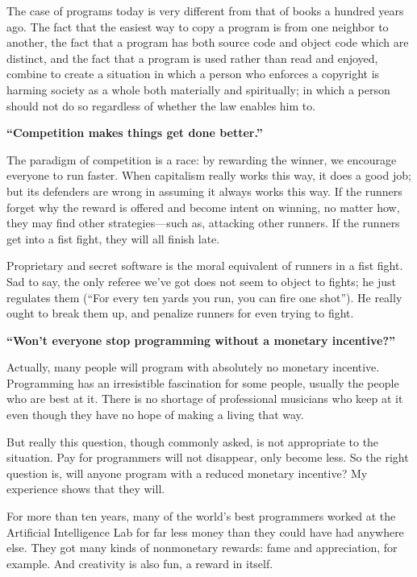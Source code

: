 The case of programs today is very different from that of books a hundred years ago. The fact that the easiest way to copy a program is from one neighbor to another, the fact that a program has both source code and object code which are distinct, and the fact that a program is used rather than read and enjoyed, combine to create a situation in which a person who enforces a copyright is harming society as a whole both materially and spiritually; in which a person should not do so regardless of whether the law enables him to.\par
\textbf{“Competition makes things get done better.”}\par
The paradigm of competition is a race: by rewarding the winner, we encourage everyone to run faster. When capitalism really works this way, it does a good job; but its defenders are wrong in assuming it always works this way. If the runners forget why the reward is offered and become intent on winning, no matter how, they may find other strategies—such as, attacking other runners. If the runners get into a fist fight, they will all finish late.\par
Proprietary and secret software is the moral equivalent of runners in a fist fight. Sad to say, the only referee we've got does not seem to object to fights; he just regulates them (“For every ten yards you run, you can fire one shot”). He really ought to break them up, and penalize runners for even trying to fight.\par
\textbf{“Won't everyone stop programming without a monetary incentive?”}\par
Actually, many people will program with absolutely no monetary incentive. Programming has an irresistible fascination for some people, usually the people who are best at it. There is no shortage of professional musicians who keep at it even though they have no hope of making a living that way.\par
But really this question, though commonly asked, is not appropriate to the situation. Pay for programmers will not disappear, only become less. So the right question is, will anyone program with a reduced monetary incentive? My experience shows that they will.\par
For more than ten years, many of the world's best programmers worked at the Artificial Intelligence Lab for far less money than they could have had anywhere else. They got many kinds of nonmonetary rewards: fame and appreciation, for example. And creativity is also fun, a reward in itself.\par
